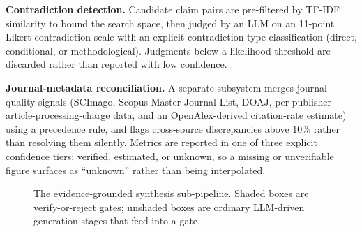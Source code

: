 \documentclass[11pt]{article}
\begin{document}
\textbf{Contradiction detection.} Candidate claim pairs are pre-filtered by TF-IDF similarity to bound the search space, then judged by an LLM on an 11-point Likert contradiction scale with an explicit contradiction-type classification (direct, conditional, or methodological). Judgments below a likelihood threshold are discarded rather than reported with low confidence.

\textbf{Journal-metadata reconciliation.} A separate subsystem merges journal-quality signals (SCImago, Scopus Master Journal List, DOAJ, per-publisher article-processing-charge data, and an OpenAlex-derived citation-rate estimate) using a precedence rule, and flags cross-source discrepancies above 10\% rather than resolving them silently. Metrics are reported in one of three explicit confidence tiers: verified, estimated, or unknown, so a missing or unverifiable figure surfaces as ``unknown'' rather than being interpolated.

\begin{figure}[ht]
\centering
{}
\caption{The evidence-grounded synthesis sub-pipeline. Shaded boxes are verify-or-reject gates; unshaded boxes are ordinary LLM-driven generation stages that feed into a gate.}
\label{fig:architecture}
\end{figure}
\end{document}
